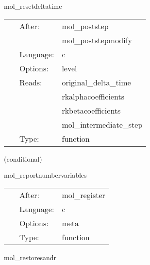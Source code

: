 \vspace{5mm}


\hspace{5mm} mol\_resetdeltatime 

\hspace{5mm}{\it if necessary, change the timestep } 


\hspace{5mm}

 \begin{tabular*}{160mm}{cll} 
~ & After:  & mol\_poststep \\ 
~& ~ &mol\_poststepmodify\\ 
~ & Language:  & c \\ 
~ & Options:  & level \\ 
~ & Reads:  & original\_delta\_time \\ 
~& ~ &rkalphacoefficients\\ 
~& ~ &rkbetacoefficients\\ 
~& ~ &mol\_intermediate\_step\\ 
~ & Type:  & function \\ 
\end{tabular*} 


\vspace{5mm}

   (conditional) 

\hspace{5mm} mol\_reportnumbervariables 

\hspace{5mm}{\it report how many of each type of variable there are } 


\hspace{5mm}

 \begin{tabular*}{160mm}{cll} 
~ & After:  & mol\_register \\ 
~ & Language:  & c \\ 
~ & Options:  & meta \\ 
~ & Type:  & function \\ 
\end{tabular*} 


\vspace{5mm}


\hspace{5mm} mol\_restoresandr 

\hspace{5mm}{\it restoring the save and restore variables to the original state } 


